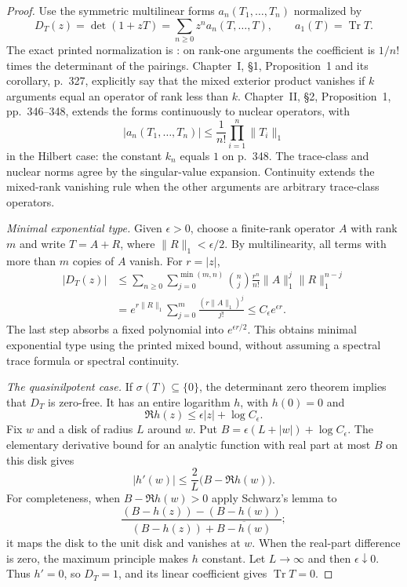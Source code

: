 \begin{proof}
Use the symmetric multilinear forms $a_n(T_1,\ldots,T_n)$ normalized by
\[
 D_T(z)=\det(1+zT)=\sum_{n\geq0}z^n a_n(T,\ldots,T),
 \qquad a_1(T)=\operatorname{Tr}T.
\]
The exact printed normalization is \cite[Chapter I, \S2, p.~328,
equations (1)--(4)]{Grothendieck1956Fredholm}: on rank-one arguments the
coefficient is $1/n!$ times the determinant of the pairings.
Chapter~I, \S1, Proposition~1 and its corollary, p.~327, explicitly say
that the mixed exterior product vanishes if $k$ arguments equal an
operator of rank less than $k$. Chapter~II, \S2, Proposition~1,
pp.~346--348, extends the forms continuously to nuclear operators, with
\[
 |a_n(T_1,\ldots,T_n)|\leq\frac1{n!}
       \prod_{i=1}^n\|T_i\|_1
\]
in the Hilbert case: the constant $k_n$ equals $1$ on p.~348. The
trace-class and nuclear norms agree by the singular-value expansion.
Continuity extends the mixed-rank vanishing rule when the other arguments
are arbitrary trace-class operators.

\emph{Minimal exponential type.}
Given $\epsilon>0$, choose a finite-rank operator $A$ with rank $m$ and
write $T=A+R$, where $\|R\|_1<\epsilon/2$. By multilinearity, all terms
with more than $m$ copies of $A$ vanish. For $r=|z|$,
\[
\begin{aligned}
 |D_T(z)|
 &\leq\sum_{n\geq0}\sum_{j=0}^{\min(m,n)}
   \binom nj\frac{r^n}{n!}\|A\|_1^j\|R\|_1^{n-j} \\
 &=e^{r\|R\|_1}\sum_{j=0}^{m}\frac{(r\|A\|_1)^j}{j!}
 \leq C_\epsilon e^{\epsilon r}.
\end{aligned}
\]
The last step absorbs a fixed polynomial into $e^{\epsilon r/2}$.
This obtains minimal exponential type using the printed mixed bound,
without assuming a spectral trace formula or spectral continuity.

\emph{The quasinilpotent case.}
If $\sigma(T)\subseteq\{0\}$, the determinant zero theorem
\cite[Chapter II, \S4, Theorem 2 and corollary, pp.~354--355]{Grothendieck1956Fredholm}
implies that $D_T$ is zero-free. It has an entire logarithm $h$, with
$h(0)=0$ and
\[
 \Re h(z)\leq\epsilon|z|+\log C_\epsilon.
\]
Fix $w$ and a disk of radius $L$ around $w$. Put
$B=\epsilon(L+|w|)+\log C_\epsilon$.
The elementary derivative bound for an analytic function with real part
at most $B$ on this disk gives
\[
 |h'(w)|\leq\frac{2}{L}\bigl(B-\Re h(w)\bigr).
\]
For completeness, when $B-\Re h(w)>0$ apply Schwarz's lemma to
\[
 \frac{(B-h(z))-(B-h(w))}
      {(B-h(z))+\overline{B-h(w)}};
\]
it maps the disk to the unit disk and vanishes at $w$. When the real-part
difference is zero, the maximum principle makes $h$ constant. Let
$L\to\infty$ and then $\epsilon\downarrow0$. Thus $h'=0$, so $D_T=1$,
and its linear coefficient gives $\operatorname{Tr}T=0$.


\end{proof}
